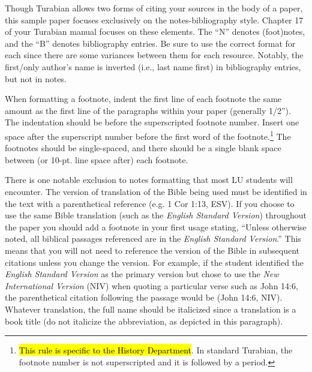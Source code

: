 \documentclass[raggedright]{turabian-researchpaper}
\begin{document}
Though Turabian allows two forms of citing your sources in the body of a paper,
this sample paper focuses exclusively on the notes-bibliography style. Chapter
17 of your Turabian manual focuses on these elements. The ``N'' denotes
(foot)notes, and the ``B'' denotes bibliography entries. Be sure to use the
correct format for each since there are some variances between them for each
resource. Notably, the first/only author's name is inverted (i.e., last name
first) in bibliography entries, but not in notes.

When formatting a footnote, indent the first line of each footnote the same
amount as the first line of the paragraphs within your paper (generally 1/2'').
The indentation should be before the superscripted footnote number. Insert one
space after the superscript number before the first word of the
footnote.\footnote{\hl{This rule is specific to the History Department}. In
standard Turabian, the footnote number is not superscripted and it is followed
by a period.} The footnotes should be single-spaced, and there should be a
single blank space between (or 10-pt. line space after) each footnote.

There is one notable exclusion to notes formatting that most LU students will
encounter. The version of translation of the Bible being used must be identified
in the text with a parenthetical reference (e.g. 1 Cor 1:13, ESV). If you choose
to use the same Bible translation (such as the \textit{English Standard
Version}) throughout the paper you should add a footnote in your first usage
stating, ``Unless otherwise noted, all biblical passages referenced are in the
\textit{English Standard Version}.'' This means that you will not need to
reference the version of the Bible in subsequent citations unless you change the
version. For example, if the student identified the \textit{English Standard
Version} as the primary version but chose to use the \textit{New International
Version} (NIV) when quoting a particular verse such as John 14:6, the
parenthetical citation following the passage would be (John 14:6, NIV). Whatever
translation, the full name should be italicized since a translation is a book
title (do not italicize the abbreviation, as depicted in this paragraph).
\end{document}
